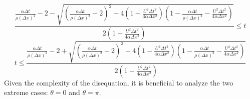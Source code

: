 \documentclass{article}
\begin{document}
\begin{equation}
\frac{\frac{\alpha \Delta t}{\rho (\Delta x)^2}-2-\sqrt{(\frac{\alpha \Delta t}{\rho (\Delta x)^2}-2)^2-4(1-\frac{U^2 \Delta t^2}{4 \alpha \Delta x^2})(1-\frac{\alpha \Delta t}{\rho (\Delta x)^2}-\frac{U^2 \Delta t^2}{4 \alpha \Delta x^2})}}{2(1-\frac{U^2 \Delta t^2}{4 \alpha \Delta x^2})}\leq t
\end{equation}
\begin{equation}
  t \leq \frac{\frac{\alpha \Delta t}{\rho (\Delta x)^2}-2+\sqrt{(\frac{\alpha \Delta t}{\rho (\Delta x)^2}-2)^2-4(1-\frac{U^2 \Delta t^2}{4 \alpha \Delta x^2})(1-\frac{\alpha \Delta t}{\rho (\Delta x)^2}-\frac{U^2 \Delta t^2}{4 \alpha \Delta x^2})}}{2(1-\frac{U^2 \Delta t^2}{4 \alpha \Delta x^2})}
\end{equation}
Given the complexity of the disequation, it is beneficial to analyze the two extreme cases: \(\theta = 0\) and \(\theta = \pi\).
\end{document}
